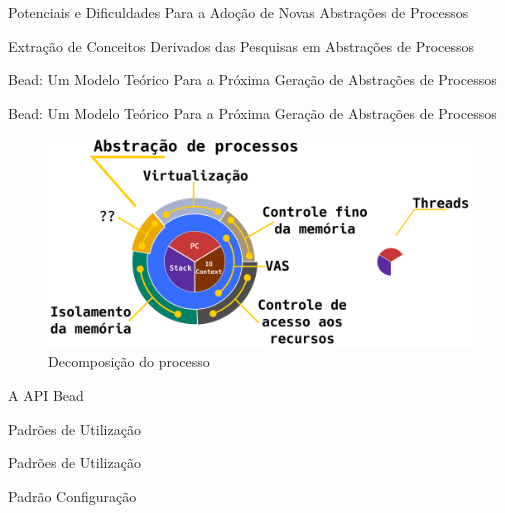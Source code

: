 \documentclass[xcolor={usenames,svgnames,dvipsnames},brazil,english,12pt,aspectratio=149]{beamer}
\begin{document}
\begin{frame}{Potenciais e Dificuldades Para a Adoção de Novas Abstrações de Processos}
	
\end{frame}

\begin{frame}{Extração de Conceitos Derivados das Pesquisas em Abstrações de Processos}
\end{frame}

\begin{frame}{Bead: Um Modelo Teórico Para a Próxima Geração de Abstrações de Processos}
	
\end{frame}

\begin{frame}{Bead: Um Modelo Teórico Para a Próxima Geração de Abstrações de Processos}
	\begin{figure}[!h]
		\centering
		\includegraphics[width=\textwidth]{decomposicao_overview}
		\caption{Decomposição do processo}
		\label{fig:decomposicao_proc}
	\end{figure}
\end{frame}

\begin{frame}{A API Bead}
\end{frame}

\begin{frame}{Padrões de Utilização}
\end{frame}

\begin{frame}{Padrões de Utilização}
\end{frame}

\begin{frame}{Padrão Configuração}
\end{frame}
\end{document}
